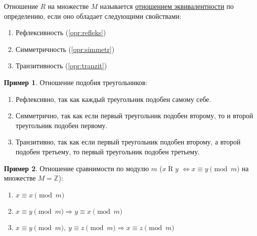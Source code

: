 \documentclass[russian]{lecture-notes}
\theoremstyle{definition}
\newtheorem{example*}{Пример}[subsection]
\newcommand{\relation}[2]{$#1\mathrel{R}#2$}
\begin{document}
\begin{definition}
	\label{opr:otnosh}
	Отношение $R$ на множестве $M$ называется \underline{отношением } \underline{эквивалентности} по определению, если оно обладает следующими свойствами:
	\begin{enumerate}
		\item Рефлексивность (\ref{opr:refleks})
		\item Симметричность (\ref{opr:simmetr})
		\item Транзитивность (\ref{opr:tranzit})
	\end{enumerate}
\end{definition}

\begin{example*}
	Отношение подобия треугольников:
	\begin{enumerate}
		\item Рефлексивно, так как каждый треугольник подобен самому себе.
		\item Симметрично, так как если первый треугольник подобен второму, то и второй треугольник подобен первому.
		\item Транзитивно, так как если первый треугольник подобен второму, а второй подобен третьему, то первый треугольник подобен третьему.
	\end{enumerate}
\end{example*}
	
\begin{example*}
		Отношение сравнимости по модулю $m$ (\relation{x}{y} $\Leftrightarrow x \equiv y \pmod m$ на множестве $M = \mathbb{Z}$):
		\begin{enumerate}
			\item $x\equiv x \pmod m$
			\item $x\equiv y \pmod m \Rightarrow y\equiv x \pmod m$
			\item $x\equiv y \pmod m, \ y\equiv z \pmod m \Rightarrow x\equiv z \pmod m$
		\end{enumerate}
\end{example*}
\end{document}
